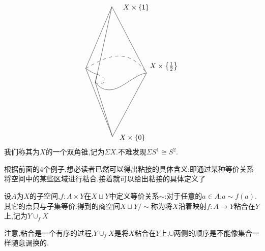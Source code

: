 \documentclass{article}
\begin{document}
\begin{example}
\[\begin{tikzpicture}[x=0.75pt,y=0.75pt,yscale=-1,xscale=1]
\draw  [dash pattern={on 4.5pt off 4.5pt}]  (111.11,138.49) .. controls (139.11,123.49) and (186.11,90.49) .. (225.11,147.49) ;
\draw    (225.11,147.49) .. controls (195.22,149.83) and (162.11,203.49) .. (129.11,165.49) ;
\draw    (129.11,165.49) -- (160.11,22.49) ;
\draw    (160.11,22.49) -- (225.11,147.49) ;
\draw    (111.11,138.49) -- (160.11,22.49) ;
\draw    (111.11,138.49) .. controls (140.11,159.49) and (132.11,138.49) .. (129.11,165.49) ;
\draw  [dash pattern={on 4.5pt off 4.5pt}]  (132.11,149.49) .. controls (162.11,162.49) and (141.11,170.49) .. (129.11,165.49) ;
\draw    (111.11,138.49) -- (161.11,266.83) ;
\draw    (129.11,165.49) -- (161.11,266.83) ;
\draw    (225.11,147.49) -- (161.11,266.83) ;

\draw (230,125.4) node [anchor=north west][inner sep=0.75pt]    {$X\times \left\{\frac{1}{2}\right\}$};
\draw (180,16.4) node [anchor=north west][inner sep=0.75pt]    {$X\times \{1\}$};
\draw (173,261.4) node [anchor=north west][inner sep=0.75pt]    {$X\times \{0\}$};
\end{tikzpicture}\]
我们称其为$X$的一个双角锥,记为$\Sigma X$.不难发现$\Sigma S^1 \cong S^2$.
\end{example}
根据前面的4个例子,想必读者已然可以得出粘接的具体含义:即通过某种等价关系将空间中的某些区域进行粘合.接着就可以给出粘接的具体定义了
\begin{definition}
    设$A$为$X$的子空间,$f : A \times Y$在$X \sqcup Y$中定义等价关系$\sim$:对于任意的$a \in A$,$a \sim f(a)$.其它的点只与子集等价.得到的商空间$X \sqcup Y /\sim$称为将$X$沿着映射$f : A \to Y$粘合在$Y$上,记为$Y \cup_{f}X$
\end{definition}
注意,粘合是一个有序的过程,$Y \cup _f X$是将$X$粘合在$Y$上,$\cup$两侧的顺序是不能像集合一样随意调换的.
\end{document}
